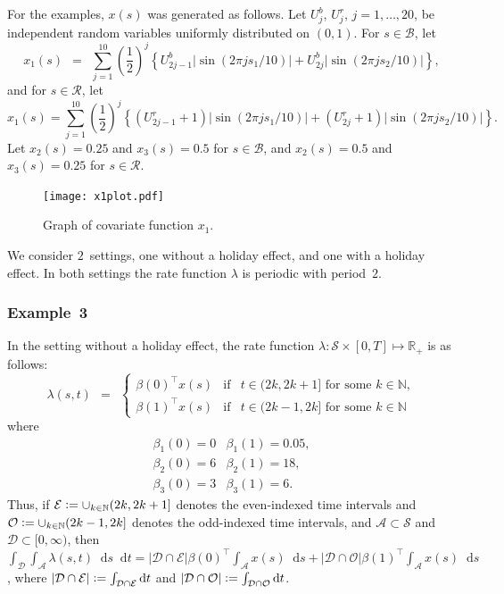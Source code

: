 \documentclass[article]{jss}
\newcommand{\NN}{\mathbb{N}}
\newcommand{\RR}{\mathbb{R}}
\def\defi{\vcentcolon=}
\def\diff{\mathop{}\!\mathrm{d}}
\begin{document}
For the examples, $x(s)$ was generated as follows.
Let $U^{b}_{j}$, $U^{r}_{j}$, $j = 1,\ldots, 20$, be independent random variables uniformly distributed on $(0,1)$.
For $s \in \mathcal{B}$, let
\[
x_{1}(s) \ \ = \ \ \sum_{j=1}^{10} \left(\frac{1}{2}\right)^{j} \left\{U^{b}_{2j-1} |\sin(2 \pi j s_{1} / 10)| + U^{b}_{2j} |\sin(2 \pi j s_{2} / 10)|\right\},
\]
and for $s \in \mathcal{R}$, let
\[
x_{1}(s) = \sum_{j=1}^{10} \left(\frac{1}{2}\right)^{j} \left\{(U^{r}_{2j-1}+1) |\sin(2 \pi j s_{1} / 10)| + (U^{r}_{2j}+1) |\sin(2 \pi j s_{2} / 10)|\right\}.
\]
Let $x_{2}(s) = 0.25$ and $x_{3}(s) = 0.5$ for $s \in \mathcal{B}$, and $x_{2}(s) = 0.5$ and $x_{3}(s) = 0.25$ for $s \in \mathcal{R}$.

\begin{figure}
\centering
\texttt{[image: x1plot.pdf]}
\caption{Graph of covariate function $x_{1}$.\label{fig:x1plot}}
\end{figure}

We consider $2$~settings, one without a holiday effect, and one with a holiday effect.
In both settings the rate function $\lambda$ is periodic with period~$2$.

\subsubsection{Example~3}

In the setting without a holiday effect, the rate function $\lambda : \mathcal{S} \times [0,T] \mapsto \RR_{+}$ is as follows:
\[
\lambda(s,t) \ \ = \ \ \left\{\begin{array}{lcl}
\beta(0)^{\top} x(s) & \mbox{if} & t \in (2k,2k+1] \mbox{ for some } k \in \NN, \\
\beta(1)^{\top} x(s) & \mbox{if} & t \in (2k-1,2k] \mbox{ for some } k \in \NN
\end{array}\right.
\]
where
\[
\begin{array}{ll}
\beta_{1}(0) = 0 & \beta_{1}(1) = 0.05, \\
\beta_{2}(0) = 6 & \beta_{2}(1) = 18, \\
\beta_{3}(0) = 3 & \beta_{3}(1) = 6.
\end{array}
\]
Thus, if $\mathcal{E} \defi \cup_{k \in \NN} (2k,2k+1]$ denotes the even-indexed time intervals and $\mathcal{O} \defi \cup_{k \in \NN} (2k-1,2k]$ denotes the odd-indexed time intervals, and $\mathcal{A} \subset \mathcal{S}$ and $\mathcal{D} \subset [0,\infty)$, then $\int_{\mathcal{D}} \int_{\mathcal{A}} \lambda(s,t) \diff s \diff t = \left|\mathcal{D} \cap \mathcal{E}\right| \beta(0)^{\top} \int_{\mathcal{A}} x(s) \diff s + \left|\mathcal{D} \cap \mathcal{O}\right| \beta(1)^{\top} \int_{\mathcal{A}} x(s) \diff s$, where $\left|\mathcal{D} \cap \mathcal{E}\right| \defi \int_{\mathcal{D} \cap \mathcal{E}} \diff t$ and $\left|\mathcal{D} \cap \mathcal{O}\right| \defi \int_{\mathcal{D} \cap \mathcal{O}} \diff t$.
\end{document}
